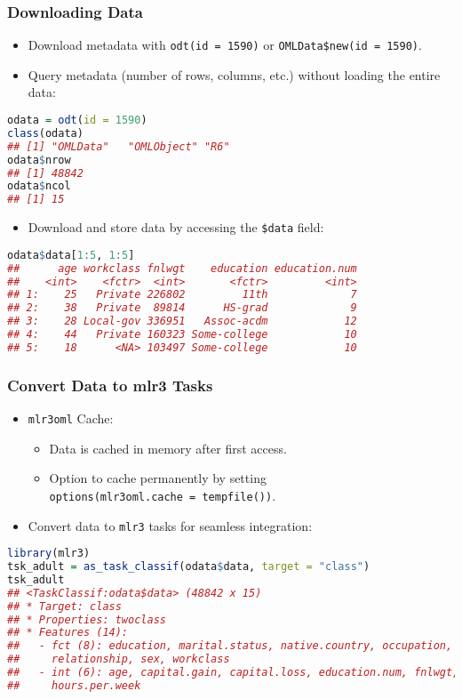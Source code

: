 \documentclass[10pt,compress,t,notes=noshow, xcolor=table]{beamer}
\begin{document}
\begin{frame}[fragile]
\frametitle{Downloading Data}
\begin{itemize}
  \item Download metadata with \texttt{odt(id = 1590)} or \texttt{OMLData\$new(id = 1590)}.
  \item Query metadata (number of rows, columns, etc.) without loading the entire data:
\end{itemize}
\begin{lstlisting}[language=R]
odata = odt(id = 1590)
class(odata)
## [1] "OMLData"   "OMLObject" "R6"   
odata$nrow
## [1] 48842
odata$ncol
## [1] 15
\end{lstlisting}

\begin{itemize}
  \item Download and store data by accessing the \texttt{\$data} field:
\end{itemize}
\begin{lstlisting}[language=R]
odata$data[1:5, 1:5]
##      age workclass fnlwgt    education education.num
##    <int>    <fctr>  <int>       <fctr>         <int>
## 1:    25   Private 226802         11th             7
## 2:    38   Private  89814      HS-grad             9
## 3:    28 Local-gov 336951   Assoc-acdm            12
## 4:    44   Private 160323 Some-college            10
## 5:    18      <NA> 103497 Some-college            10
\end{lstlisting}
\end{frame}

\begin{frame}[fragile]
\frametitle{Convert Data to mlr3 Tasks}
\begin{itemize}
  \item \texttt{mlr3oml} Cache: 
  \begin{itemize}
      \item Data is cached in memory after first access.
      \item Option to cache permanently by setting\\ \texttt{options(mlr3oml.cache = tempfile())}.
  \end{itemize} 
  \item Convert data to \texttt{mlr3} tasks for seamless integration:
\end{itemize}
\begin{lstlisting}[language=R]
library(mlr3)
tsk_adult = as_task_classif(odata$data, target = "class")
tsk_adult
## <TaskClassif:odata$data> (48842 x 15)
## * Target: class
## * Properties: twoclass
## * Features (14):
##   - fct (8): education, marital.status, native.country, occupation, race, 
##     relationship, sex, workclass
##   - int (6): age, capital.gain, capital.loss, education.num, fnlwgt, 
##     hours.per.week
\end{lstlisting}
\end{frame}
\end{document}
